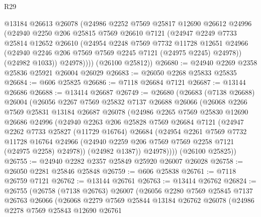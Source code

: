 \begin{lexlean}{R29}
\begin{coremodule}
          @13184
          @26613
          @26078
          (@24986
            @2252
            @7569
            @25817
            @12690
            @26612
            @24996
            (@24940
              @2250
              @206
              @25815
              @7569
              @26610
              @7121
              (@24947
                @2249
                @7733
                @25814
                @12652
                @26610
                (@24954
                  @2248
                  @7569
                  @7732
                  @11728
                  @12651
                  @24966
                  (@24940 @2246 @206 @7569 @7569 @2245 @7121 (@24975 @2245) @24978))
                (@24982 @1033))
              @24978))))
      (@26100 @25812))
@26680 := @24940 @2269 @2358 @25836 @25921 @26004 @26029
@26683 := @26050 @2268 @25833 @25835
@26684 := @606 @25825
@26686 := @7118 @26684 @7121
@26687 := @13144 @26686
@26688 := @13414 @26687
@26749 := @26680
    (@26683
      (@7138 @26688)
      @26004
      (@26056
        @2267
        @7569
        @25832
        @7137
        @26688
        @26066
        (@26068
          @2266
          @7569
          @25831
          @13184
          @26687
          @26078
          (@24986
            @2265
            @7569
            @25830
            @12690
            @26686
            @24996
            (@24940
              @2263
              @206
              @25828
              @7569
              @26684
              @7121
              (@24947
                @2262
                @7733
                @25827
                (@11729 @16764)
                @26684
                (@24954
                  @2261
                  @7569
                  @7732
                  @11728
                  @16764
                  @24966
                  (@24940 @2259 @206 @7569 @7569 @2258 @7121 (@24975 @2258) @24978))
                (@24982 @1387))
              @24978))))
      (@26100 @25825))
@26755 := @24940 @2282 @2357 @25849 @25920 @26007 @26028
@26758 := @26050 @2281 @25846 @25848
@26759 := @606 @25838
@26761 := @7118 @26759 @7121
@26762 := @13144 @26761
@26763 := @13414 @26762
@26824 := @26755
    (@26758
      (@7138 @26763)
      @26007
      (@26056
        @2280
        @7569
        @25845
        @7137
        @26763
        @26066
        (@26068
          @2279
          @7569
          @25844
          @13184
          @26762
          @26078
          (@24986
            @2278
            @7569
            @25843
            @12690
            @26761

\end{coremodule}
\end{lexlean}
